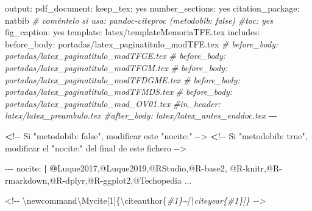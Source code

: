 \documentclass[11pt,a4paper,oneside,]{article}
\newenvironment{Shaded}{\begin{snugshade}}{\end{snugshade}}
\newcommand{\CommentTok}[1]{\textcolor[rgb]{0.56,0.35,0.01}{\textit{#1}}}
\newcommand{\DecValTok}[1]{\textcolor[rgb]{0.00,0.00,0.81}{#1}}
\newcommand{\ErrorTok}[1]{\textcolor[rgb]{0.64,0.00,0.00}{\textbf{#1}}}
\newcommand{\NormalTok}[1]{#1}
\newcommand{\OtherTok}[1]{\textcolor[rgb]{0.56,0.35,0.01}{#1}}
\newcommand{\SpecialCharTok}[1]{\textcolor[rgb]{0.00,0.00,0.00}{#1}}
\newcommand{\StringTok}[1]{\textcolor[rgb]{0.31,0.60,0.02}{#1}}
\numberwithin{dummy}{section}
\theoremstyle{ocrenumbox}
\theoremstyle{blacknumex}
\theoremstyle{blacknumbox}
\theoremstyle{ocrenum}
\theoremstyle{ocrenum}
\begin{document}
\begin{Shaded}
\begin{Highlighting}[numbers=left,,]
\NormalTok{output}\SpecialCharTok{:} 
\NormalTok{  pdf\_document}\SpecialCharTok{:}
\NormalTok{    keep\_tex}\SpecialCharTok{:}\NormalTok{ yes}
\NormalTok{    number\_sections}\SpecialCharTok{:}\NormalTok{ yes}
\NormalTok{    citation\_package}\SpecialCharTok{:}\NormalTok{ natbib  }\CommentTok{\# coméntelo si usa: pandoc{-}citeproc (metodobib: false)}
    \CommentTok{\#toc: yes}
\NormalTok{    fig\_caption}\SpecialCharTok{:}\NormalTok{ yes}
\NormalTok{    template}\SpecialCharTok{:}\NormalTok{ latex}\SpecialCharTok{/}\NormalTok{templateMemoriaTFE.tex}
\NormalTok{    includes}\SpecialCharTok{:}
\NormalTok{      before\_body}\SpecialCharTok{:}\NormalTok{ portadas}\SpecialCharTok{/}\NormalTok{latex\_paginatitulo\_modTFE.tex}
\CommentTok{\#      before\_body: portadas/latex\_paginatitulo\_modTFGE.tex}
\CommentTok{\#      before\_body: portadas/latex\_paginatitulo\_modTFGM.tex}
\CommentTok{\#      before\_body: portadas/latex\_paginatitulo\_modTFDGME.tex}
\CommentTok{\#      before\_body: portadas/latex\_paginatitulo\_modTFMDS.tex}
\CommentTok{\#      before\_body: portadas/latex\_paginatitulo\_mod\_OV01.tex}
      \CommentTok{\#in\_header: latex/latex\_preambulo.tex}
      \CommentTok{\#after\_body: latex/latex\_antes\_enddoc.tex}
\SpecialCharTok{{-}{-}{-}}

\ErrorTok{\textless{}}\SpecialCharTok{!{-}{-}}\NormalTok{ Si }\StringTok{"metodobib: false"}\NormalTok{, modificar este }\StringTok{"nocite:"}  \SpecialCharTok{{-}}\OtherTok{{-}\textgreater{}}
\ErrorTok{\textless{}}\SpecialCharTok{!{-}{-}}\NormalTok{ Si }\StringTok{"metodobib: true"}\NormalTok{, modificar el }\StringTok{"nocite:"}\NormalTok{ del final de este fichero  }\SpecialCharTok{{-}}\OtherTok{{-}\textgreater{}}

\SpecialCharTok{{-}{-}{-}}
\NormalTok{nocite}\SpecialCharTok{:} \ErrorTok{|} 
  \ErrorTok{@}\NormalTok{Luque2017,}\SpecialCharTok{@}\NormalTok{Luque2019,}\SpecialCharTok{@}\NormalTok{RStudio,}\SpecialCharTok{@}\NormalTok{R}\SpecialCharTok{{-}}\NormalTok{base2,}
  \SpecialCharTok{@}\NormalTok{R}\SpecialCharTok{{-}}\NormalTok{knitr,}\SpecialCharTok{@}\NormalTok{R}\SpecialCharTok{{-}}\NormalTok{rmarkdown,}\SpecialCharTok{@}\NormalTok{R}\SpecialCharTok{{-}}\NormalTok{dplyr,}\SpecialCharTok{@}\NormalTok{R}\SpecialCharTok{{-}}\NormalTok{ggplot2,}\SpecialCharTok{@}\NormalTok{Techopedia}
\NormalTok{...}


\SpecialCharTok{\textless{}!{-}{-}}\NormalTok{ \textbackslash{}newcommand\textbackslash{}Mycite[}\DecValTok{1}\NormalTok{]\{\textbackslash{}citeauthor\{}\CommentTok{\#1\}\textasciitilde{}[\textbackslash{}citeyear\{\#1\}]\} {-}{-}\textgreater{}}


\end{Highlighting}
\end{Shaded}
\end{document}
